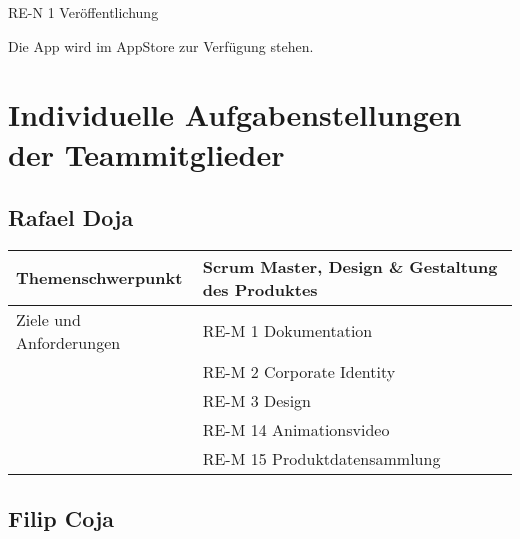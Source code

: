 RE-N 1 Veröffentlichung

Die App wird im AppStore zur Verfügung stehen.

\hypertarget{individuelle-aufgabenstellungen-der-teammitglieder}{%
\section{Individuelle Aufgabenstellungen der
Teammitglieder}\label{individuelle-aufgabenstellungen-der-teammitglieder}}

\hypertarget{rafael-doja}{%
\subsection{Rafael Doja}\label{rafael-doja}}

\begin{longtable}[]{@{}ll@{}}
\toprule
Themenschwerpunkt & Scrum Master, Design \& Gestaltung des
Produktes\tabularnewline
\midrule
\endhead
Ziele und Anforderungen & RE-M 1 Dokumentation\tabularnewline
& RE-M 2 Corporate Identity\tabularnewline
& RE-M 3 Design\tabularnewline
& RE-M 14 Animationsvideo\tabularnewline
& RE-M 15 Produktdatensammlung\tabularnewline
\bottomrule
\end{longtable}

\hypertarget{filip-coja}{%
\subsection{Filip Coja}\label{filip-coja}}

